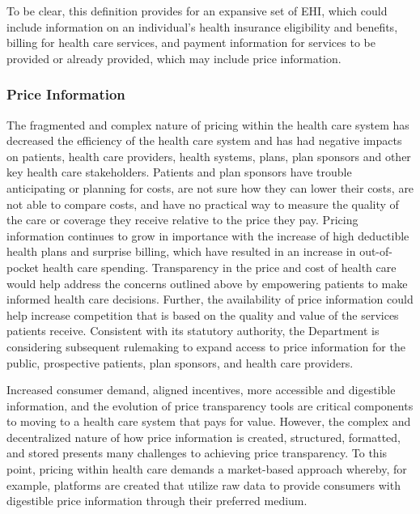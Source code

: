 \documentclass[twoside,11pt]{article}
\begin{document}
          To be clear, this definition provides for an expansive set of EHI, which could include information on an individual's health insurance eligibility and benefits, billing for health care services, and payment information for services to be provided or already provided, which may include price information.


          \subsubsection{Price Information}

          The fragmented and complex nature of pricing within the health care system has decreased the efficiency of the health care system and has had negative impacts on patients, health care providers, health systems, plans, plan sponsors and other key health care stakeholders. Patients and plan sponsors have trouble anticipating or planning for costs, are not sure how they can lower their costs, are not able to compare costs, and have no practical way to measure the quality of the care or coverage they receive relative to the price they pay. Pricing information continues to grow in importance with the increase of high deductible health plans and surprise billing, which have resulted in an increase in out-of-pocket health care spending. Transparency in the price and cost of health care would help address the concerns outlined above by empowering patients to make informed health care decisions. Further, the availability of price information could help increase competition that is based on the quality and value of the services patients receive. Consistent with its statutory authority, the Department is considering subsequent rulemaking to expand access to price information for the public, prospective patients, plan sponsors, and health care providers.


          Increased consumer demand, aligned incentives, more accessible and digestible information, and the evolution of price transparency tools are critical components to moving to a health care system that pays for value. However, the complex and decentralized nature of how price information is created, structured, formatted, and stored presents many challenges to achieving price transparency. To this point, pricing within health care demands a market-based approach whereby, for example, platforms are created that utilize raw data to provide consumers with digestible price information through their preferred medium.
\end{document}
